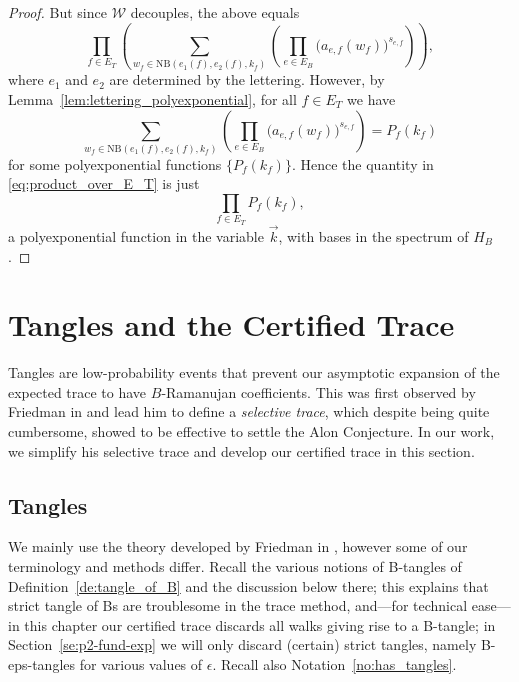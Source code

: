 \documentclass{memo-l}
\theoremstyle{plain}
\theoremstyle{definition}
\numberwithin{section}{chapter}
\numberwithin{equation}{chapter}
\theoremstyle{plain}
\theoremstyle{definition}
\newcommand\cW{\mathcal{W}}
\begin{document}
\begin{proof}
But since $\cW$ decouples, the above equals 
\begin{equation}
\label{eq:product_over_E_T}
\prod_{f\in E_T} \left( \sum_{w_f \in \mathrm{NB}(e_1(f), e_2(f),k_f ) }
\left( \prod_{e\in E_B} \bigl( a_{e,f}(w_f) \bigr)^{s_{e,f}} \right) \right) ,
\end{equation}
where \( e_1 \) and \( e_2 \) are determined by the lettering. 
However, by
Lemma~\ref{lem:lettering_polyexponential}, for all $f\in E_T$ we have
$$
\sum_{w_f \in \mathrm{NB}(e_1(f), e_2(f),k_f ) }
\left( \prod_{e\in E_B} \bigl( a_{e,f}(w_f) \bigr)^{s_{e,f}} \right) 
= P_f(k_f)
$$
for some polyexponential functions $\{P_f(k_f)\}$. 
Hence the quantity in \eqref{eq:product_over_E_T} is just
$$
\prod_{f\in E_T}
P_f(k_f), 
$$
a polyexponential function in the variable $\vec k$, with bases in the
spectrum of $H_B$.  
\end{proof}



\section{Tangles and the Certified Trace}
\label{se:p1-tangles}

Tangles are low-probability events that prevent our asymptotic expansion of
the expected trace to have \(B\)-Ramanujan coefficients. This was first
observed by Friedman in \cite{friedman_alon} and lead him to define a
\emph{selective trace}, which despite being quite cumbersome, showed to be
effective to settle the Alon Conjecture. In our work, we simplify his
selective trace and develop our certified trace in this section. 

%
%
%
%
\subsection{Tangles}\label{tangles:subsection:tangles}

We mainly use the theory developed by Friedman in
\cite{friedman_alon}, however some of our terminology and methods
differ.
Recall the various notions of \glspl{B-tangle} of 
Definition~\ref{de:tangle_of_B} and the discussion below there;
this explains that \glspl{strict tangle of B} are troublesome in the
trace method, and---for technical ease---in this chapter our certified
trace discards all walks giving rise to a \gls{B-tangle};
in Section~\ref{se:p2-fund-exp} we will only discard (certain)
strict tangles, namely \glspl{B-eps-tangle} for various values of
$\epsilon$.
Recall also
Notation~\ref{no:has_tangles}.
\end{document}
